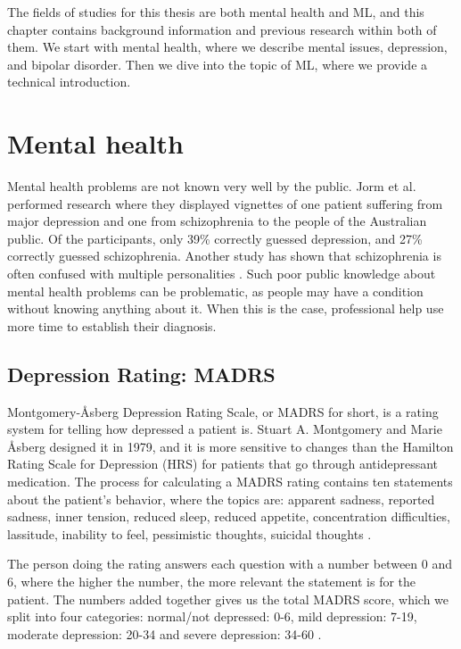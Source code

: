
The fields of studies for this thesis are both mental health and ML, and this chapter contains background information and previous research within both of them. We start with mental health, where we describe mental issues, depression, and bipolar disorder. Then we dive into the topic of ML, where we provide a technical introduction.

\section{Mental health}
Mental health problems are not known very well by the public. Jorm et al. performed research \cite{jorm1997mental} where they displayed vignettes of one patient suffering from major depression and one from schizophrenia to the people of the Australian public. Of the participants, only 39\% correctly guessed depression, and 27\% correctly guessed schizophrenia. Another study has shown that schizophrenia is often confused with multiple personalities \cite{angermeyer1999social}. Such poor public knowledge about mental health problems can be problematic, as people may have a condition without knowing anything about it. When this is the case, professional help use more time to establish their diagnosis. 

\subsection{Depression Rating: MADRS}
Montgomery-Åsberg Depression Rating Scale, or MADRS for short, is a rating system for telling how depressed a patient is. Stuart A. Montgomery and Marie Åsberg designed it in 1979, and it is more sensitive to changes than the Hamilton Rating Scale for Depression (HRS) for patients that go through antidepressant medication. The process for calculating a MADRS rating contains ten statements about the patient's behavior, where the topics are: apparent sadness, reported sadness, inner tension, reduced sleep, reduced appetite, concentration difficulties, lassitude, inability to feel, pessimistic thoughts, suicidal thoughts \cite{madrs_paper}.


The person doing the rating answers each question with a number between 0 and 6, where the higher the number, the more relevant the statement is for the patient. The numbers added together gives us the total MADRS score, which we split into four categories: normal/not depressed: 0-6, mild depression: 7-19, moderate depression: 20-34 and severe depression: 34-60 \cite{sunnybrook_stroke_study}. 

